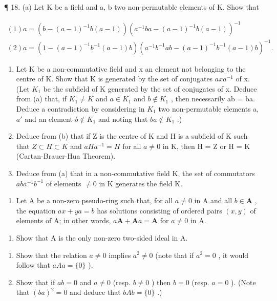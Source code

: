 ¶ 18. (a) Let K be a field and a, b two non-permutable elements of K. Show that

\[
\begin{array}{l} (1) a = (b - (a - 1) ^ {- 1} b (a - 1)) (a ^ {- 1} b a - (a - 1) ^ {- 1} b (a - 1)) ^ {- 1} \\ (2) a = (1 - (a - 1) ^ {- 1} b ^ {- 1} (a - 1) b) (a ^ {- 1} b ^ {- 1} a b - (a - 1) ^ {- 1} b ^ {- 1} (a - 1) b) ^ {- 1}. \end{array}
\]

\begin{enumerate}
\def\labelenumi{(\alph{enumi})}
\setcounter{enumi}{1}
\item
  Let K be a non-commutative field and x an element not belonging to the centre of K. Show that K is generated by the set of conjugates \(axa^{-1}\) of x. (Let \(K_{1}\) be the subfield of K generated by the set of conjugates of x. Deduce from (a) that, if \(K_{1} \neq K\) and \(a \in K_{1}\) and \(b \notin K_{1}\) , then necessarily ab = ba. Deduce a contradiction by considering in \(K_{1}\) two non-permutable elements a, \(a'\) and an element \(b \notin K_{1}\) and noting that \(ba \notin K_{1}\) .)
\item
  Deduce from (b) that if Z is the centre of K and H is a subfield of K such that \(Z \subset H \subset K\) and \(aHa^{-1} = H\) for all \(a \neq 0\) in K, then H = Z or H = K (Cartan-Brauer-Hua Theorem).
\item
  Deduce from (a) that in a non-commutative field K, the set of commutators \(aba^{-1}b^{-1}\) of elements \(\neq0\) in K generates the field K.
\end{enumerate}

\begin{enumerate}
\def\labelenumi{\arabic{enumi}.}
\setcounter{enumi}{18}
\tightlist
\item
  Let A be a non-zero pseudo-ring such that, for all \(a \neq 0\) in A and all \(b \in \mathbf{A}\) , the equation \(ax + ya = b\) has solutions consisting of ordered pairs \((x, y)\) of elements of A; in other words, \(a\mathbf{A} + \mathbf{A}a = \mathbf{A}\) for \(a \neq 0\) in A.
\end{enumerate}

\begin{enumerate}
\def\labelenumi{(\alph{enumi})}
\tightlist
\item
  Show that A is the only non-zero two-sided ideal in A.
\end{enumerate}

\begin{enumerate}
\def\labelenumi{(\alph{enumi})}
\setcounter{enumi}{1}
\item
  Show that the relation \(a \neq 0\) implies \(a^2 \neq 0\) (note that if \(a^2 = 0\) , it would follow that \(aAa = \{0\}\) ).
\item
  Show that if \(ab = 0\) and \(a \neq 0\) (resp. \(b \neq 0\) ) then \(b = 0\) (resp. \(a = 0\) ). (Note that \((ba)^2 = 0\) and deduce that \(bAb = \{0\}\) .)
\end{enumerate}

